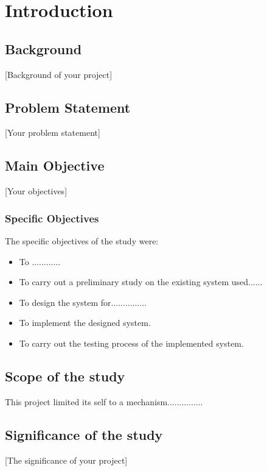 \chapter{Introduction}

\section{Background}
[Background of your project]



\section{Problem Statement}
[Your problem statement]
\section{Main Objective}
[Your objectives]
\subsection{Specific Objectives}
The specific objectives of the study were: 
\begin{itemize}
\item To ............
\item To carry out a preliminary study on the existing system used...... 
\item To design the system for...............
\item To implement the designed system.
\item To carry out the testing process of the implemented system.
\end{itemize}

\section{Scope of the study}
This project limited its self to a mechanism...............

\section{Significance of the study}
[The significance of your project]